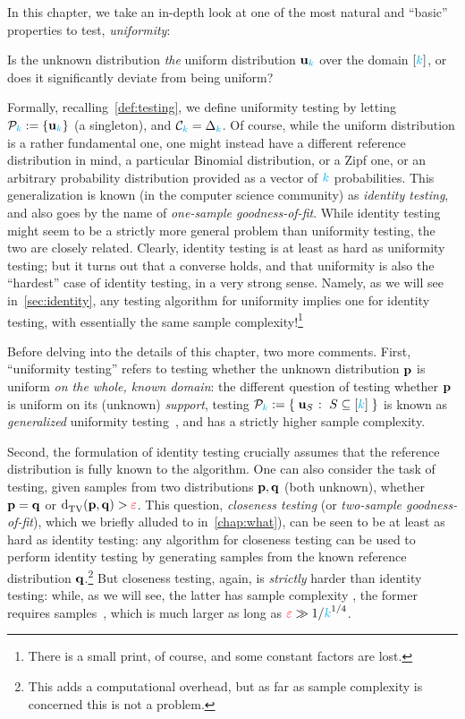 In this chapter, we take an in-depth look at one of the most natural and ``basic'' properties to test, \emph{uniformity}: 
\begin{framed}
Is the unknown distribution \emph{the} uniform distribution $\mathbf{u}_{\textcolor{cyan}{k}}$ over the domain $[{\textcolor{cyan}{k}}]$, or does it significantly deviate from being uniform?
\end{framed}
Formally, recalling~\cref{def:testing}, we define uniformity testing by letting $\mathcal{P}_{\textcolor{cyan}{k}} := \{\mathbf{u}_{\textcolor{cyan}{k}}\}$ (a singleton), and $\mathcal{C}_{\textcolor{cyan}{k}}=\Delta_{{\textcolor{cyan}{k}}}$. Of course, while the uniform distribution is a rather fundamental one, one might instead have a different reference distribution in mind, \eg a particular Binomial distribution, or a Zipf one, or an arbitrary probability distribution provided as a vector of ${\textcolor{cyan}{k}}$ probabilities. This generalization is known (in the computer science community) as \emph{identity testing}, and also goes by the name of \emph{one-sample goodness-of-fit}. While identity testing might seem to be a strictly more general problem than uniformity testing, the two are closely related. Clearly, identity testing is at least as hard as uniformity testing; but it turns out that a converse holds, and that uniformity is also the ``hardest'' case of identity testing, in a very strong sense. Namely, as we will see in~\cref{sec:identity}, any testing algorithm for uniformity implies one for identity testing, with essentially the same sample complexity!\footnote{There is a small print, of course, and some constant factors are lost.}

Before delving into the details of this chapter, two more comments. First, ``uniformity testing'' refers to testing whether the unknown distribution $\mathbf{p}$ is uniform \emph{on the whole, known domain}: the different question of testing whether $\mathbf{p}$ is uniform on its (unknown) \emph{support}, \ie testing $\property_\ab \eqdef \setOfSuchThat{\uniform_S}{ S \subseteq [\ab]}$ is known as \emph{generalized} uniformity testing~\citep{BatuC17}, and has a strictly higher sample complexity.

Second, the formulation of identity testing crucially assumes that the reference distribution is fully known to the algorithm. One can also consider the task of testing, given samples from two distributions $\mathbf{p},\mathbf{q}$ (both unknown), whether $\mathbf{p}=\mathbf{q}$ or $\totalvardist{\p}{\q}>\dst$. This question, \emph{closeness testing} (or \emph{two-sample goodness-of-fit}), which we briefly alluded to in~\cref{chap:what}), can be seen to be at least as hard as identity testing: any algorithm for closeness testing can be used to perform identity testing by generating \iid samples from the known reference distribution $\mathbf{q}$.\footnote{This adds a computational overhead, but as far as sample complexity is concerned this is not a problem.} But closeness testing, again, is \emph{strictly} harder than identity testing: while, as we will see, the latter has sample complexity \smash{$\Theta\big({\sqrt{\ab}/\dst^2\big)}$}, the former requires  samples~\citep{ChanDVV14}, which is much larger as long as $\textcolor{red}{\varepsilon} \gg 1/{\textcolor{cyan}{k}}^{1/4}$.\medskip


